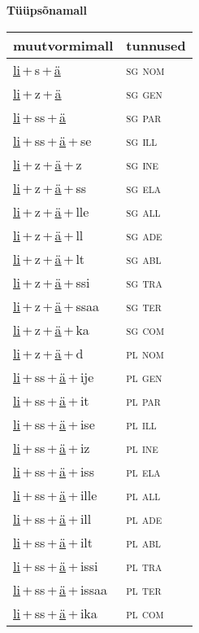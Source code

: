 
\vspace{1.8em}
\begin{minipage}{\textwidth}
\textbf{Tüüpsõnamall \,}\\

\begin{sideways}
\begin{tabular}{l l}
muutvormimall & tunnused \\
\hline
\underline{li}\,+\,s\,+\,\underline{ä} & \textsc{ sg nom } \\
\underline{li}\,+\,z\,+\,\underline{ä} & \textsc{ sg gen } \\
\underline{li}\,+\,ss\,+\,\underline{ä} & \textsc{ sg par } \\
\underline{li}\,+\,ss\,+\,\underline{ä}\,+\,se & \textsc{ sg ill } \\
\underline{li}\,+\,z\,+\,\underline{ä}\,+\,z & \textsc{ sg ine } \\
\underline{li}\,+\,z\,+\,\underline{ä}\,+\,ss & \textsc{ sg ela } \\
\underline{li}\,+\,z\,+\,\underline{ä}\,+\,lle & \textsc{ sg all } \\
\underline{li}\,+\,z\,+\,\underline{ä}\,+\,ll & \textsc{ sg ade } \\
\underline{li}\,+\,z\,+\,\underline{ä}\,+\,lt & \textsc{ sg abl } \\
\underline{li}\,+\,z\,+\,\underline{ä}\,+\,ssi & \textsc{ sg tra } \\
\underline{li}\,+\,z\,+\,\underline{ä}\,+\,ssaa & \textsc{ sg ter } \\
\underline{li}\,+\,z\,+\,\underline{ä}\,+\,ka & \textsc{ sg com } \\
\underline{li}\,+\,z\,+\,\underline{ä}\,+\,d & \textsc{ pl nom } \\
\underline{li}\,+\,ss\,+\,\underline{ä}\,+\,ije & \textsc{ pl gen } \\
\underline{li}\,+\,ss\,+\,\underline{ä}\,+\,it & \textsc{ pl par } \\
\underline{li}\,+\,ss\,+\,\underline{ä}\,+\,ise & \textsc{ pl ill } \\
\underline{li}\,+\,ss\,+\,\underline{ä}\,+\,iz & \textsc{ pl ine } \\
\underline{li}\,+\,ss\,+\,\underline{ä}\,+\,iss & \textsc{ pl ela } \\
\underline{li}\,+\,ss\,+\,\underline{ä}\,+\,ille & \textsc{ pl all } \\
\underline{li}\,+\,ss\,+\,\underline{ä}\,+\,ill & \textsc{ pl ade } \\
\underline{li}\,+\,ss\,+\,\underline{ä}\,+\,ilt & \textsc{ pl abl } \\
\underline{li}\,+\,ss\,+\,\underline{ä}\,+\,issi & \textsc{ pl tra } \\
\underline{li}\,+\,ss\,+\,\underline{ä}\,+\,issaa & \textsc{ pl ter } \\
\underline{li}\,+\,ss\,+\,\underline{ä}\,+\,ika & \textsc{ pl com } \\
\end{tabular}
\end{sideways}
\label{tab:tüüpsõnamall-lisä}


\end{minipage}
